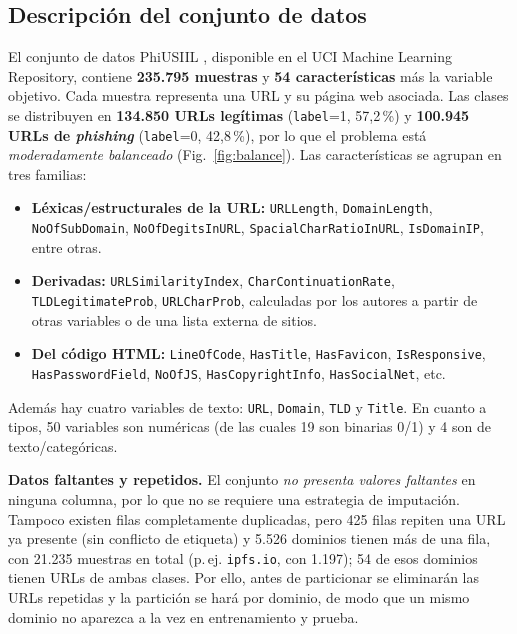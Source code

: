\documentclass[conference]{IEEEtran}
\begin{document}
\subsection{Descripción del conjunto de datos}
El conjunto de datos PhiUSIIL \cite{prasad2024}, disponible en el UCI Machine Learning
Repository, contiene \textbf{235.795 muestras} y \textbf{54 características} más la variable
objetivo. Cada muestra representa una URL y su página web asociada. Las clases se distribuyen en
\textbf{134.850 URLs legítimas} (\texttt{label}=1, 57,2\,\%) y \textbf{100.945 URLs de
\textit{phishing}} (\texttt{label}=0, 42,8\,\%), por lo que el problema está
\emph{moderadamente balanceado} (Fig.~\ref{fig:balance}). Las características se agrupan en tres
familias:
\begin{itemize}
  \item \textbf{Léxicas/estructurales de la URL:} \texttt{URLLength}, \texttt{DomainLength},
        \texttt{NoOfSubDomain}, \texttt{NoOfDegitsInURL}, \texttt{SpacialCharRatioInURL},
        \texttt{IsDomainIP}, entre otras.
  \item \textbf{Derivadas:} \texttt{URLSimilarityIndex}, \texttt{CharContinuationRate},
        \texttt{TLDLegitimateProb}, \texttt{URLCharProb}, calculadas por los autores a partir
        de otras variables o de una lista externa de sitios.
  \item \textbf{Del código HTML:} \texttt{LineOfCode}, \texttt{HasTitle}, \texttt{HasFavicon},
        \texttt{IsResponsive}, \texttt{HasPasswordField}, \texttt{NoOfJS},
        \texttt{HasCopyrightInfo}, \texttt{HasSocialNet}, etc.
\end{itemize}
Además hay cuatro variables de texto: \texttt{URL}, \texttt{Domain}, \texttt{TLD} y
\texttt{Title}. En cuanto a tipos, 50 variables son numéricas (de las cuales 19 son binarias
0/1) y 4 son de texto/categóricas.

\textbf{Datos faltantes y repetidos.} El conjunto \emph{no presenta valores faltantes} en
ninguna columna, por lo que no se requiere una estrategia de imputación. Tampoco existen filas
completamente duplicadas, pero 425 filas repiten una URL ya presente (sin conflicto de etiqueta)
y 5.526 dominios tienen más de una fila, con 21.235 muestras en total (p.\,ej.
\texttt{ipfs.io}, con 1.197); 54 de esos dominios tienen URLs de ambas clases. Por ello, antes de
particionar se eliminarán las URLs repetidas y la partición se hará por dominio, de modo que un
mismo dominio no aparezca a la vez en entrenamiento y prueba.
\end{document}

